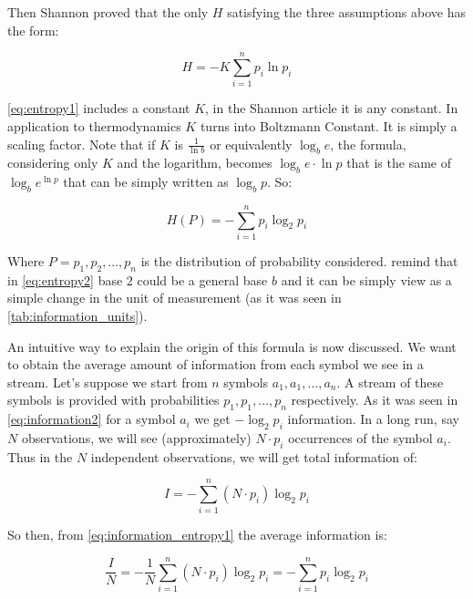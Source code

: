 \documentclass[12pt, a4paper]{report}
\begin{document}
Then Shannon proved that the only \(H\) satisfying the three assumptions above has the form:

\begin{equation} \label{eq:entropy1}
  H = -K \sum_{i = 1}^{n} p_i \ln p_i
\end{equation}

\autoref{eq:entropy1} includes a constant \(K\), in the Shannon article it is any constant. In application to thermodynamics \(K\)
turns into Boltzmann Constant. It is simply a scaling factor. Note that if \(K\) is \(\frac{1}{\ln b}\) or equivalently
\(\log_b e\), the formula, considering only \(K\) and the logarithm, becomes \(\log_b e \cdot \ln p\) that is the same of
\(\log_b e^{\ln p}\) that can be simply written as \(\log_b p\). So:

\begin{equation} \label{eq:entropy2}
  H(P) = - \sum_{i = 1}^{n} p_i \log_2 p_i
\end{equation}

Where \(P = {p_1, p_2, \dots, p_n}\) is the distribution of probability considered.
remind that in \autoref{eq:entropy2} base \(2\) could be a general base \(b\) and it can be simply view as a simple change in the
unit of measurement (as it was seen in \autoref{tab:information_units}).

An intuitive way to explain the origin of this formula is now discussed. We want to obtain the average amount of information from
each symbol we see in a stream. Let's suppose we start from \(n\) symbols \(a_1, a_1, \dots, a_n\).
A stream of these symbols is provided with probabilities \(p_1, p_1, \dots, p_n\) respectively.
As it was seen in \autoref{eq:information2} for a symbol \(a_i\) we get \(-\log_2 p_i\) information.
In a long run, say \(N\) observations, we will see (approximately) \(N \cdot p_i\) occurrences of the symbol \(a_i\).
Thus in the \(N\) independent observations, we will get total information of:

\begin{equation} \label{eq:information_entropy1}
  I = - \sum_{i = 1}^n (N \cdot p_i) \log_2 p_i
\end{equation}

So then, from \autoref{eq:information_entropy1} the average information is:

\begin{equation} \label{eq:information_entropy2}
  \frac{I}{N} = - \frac{1}{N} \sum_{i = 1}^n (N \cdot p_i) \log_2 p_i = - \sum_{i = 1}^n p_i \log_2 p_i
\end{equation}
\end{document}
